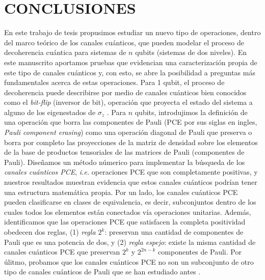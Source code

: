 

\chapter{CONCLUSIONES}
En este trabajo de tesis propusimos estudiar un nuevo tipo de operaciones, dentro
del marco teórico de los canales cuánticos, 
que pueden modelar el proceso de decoherencia cuántica para sistemas de $n$ qubits 
(sistemas de dos niveles). 
En este manuscrito aportamos pruebas que evidencian
una caracterización propia de este tipo de canales cuánticos
y, con esto, se abre la posibilidad a preguntas más fundamentales acerca de estas 
operaciones.
Para 1 qubit, el proceso de decoherencia
puede describirse por medio de canales cuánticos bien conocidos como 
el \textit{bit-flip} (inversor de bit), operación que proyecta el estado del 
sistema a alguno de los eigenestados de $\sigma_z$
\cite{bengtsson_zyczkowski_2017,nathanson2007pauli,nielsen_chuang_2011}. 
Para $n$ qubits, 
introdujimos la definición de una operación que borra las componentes de Pauli
(PCE por sus siglas en ingles, \textit{Pauli component erasing}) como una 
operación diagonal de Pauli que preserva o borra por completo 
las proyecciones de la matriz de densidad sobre los elementos de la
base de productos tensoriales de las matrices de Pauli (componentes de Pauli). 
Diseñamos un método 
númerico para implementar la búsqueda de los \textit{canales cuánticos PCE},
\textit{i.e.} operaciones PCE que son completamente positivas, y nuestros 
resultados muestran evidencia que estos canales cuánticos podrían tener
una estructura matemática propia. 
Por un lado, los canales cuánticos PCE pueden clasificarse en clases de equivalencia, 
es decir, subconjuntos dentro de los cuales todos los elementos están 
conectados vía operaciones unitarias. 
Además, identificamos que las operaciones PCE 
que satisfacen la completa positividad obedecen dos reglas, (1) \textit{regla
$\mathit{2^k}$}: preservan una cantidad de componentes de Pauli
que es una potencia de dos, y (2) \textit{regla espejo}:
existe la misma cantidad de canales cuánticos PCE que preservan $2^k$ 
y $2^{2n-k}$ componentes de Pauli.
Por úlitmo, probamos que los canales cuánticos PCE no son un subconjunto
de otro tipo de canales cuánticos de Pauli que se han estudiado antes 
\cite{nathanson2007pauli}. 



